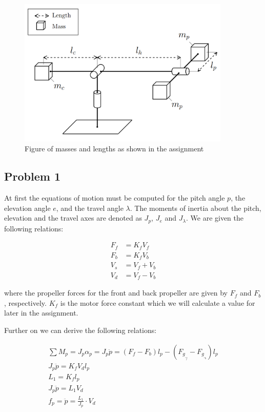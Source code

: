 \begin{figure}[H]
	\centering
	\includegraphics[width=0.9\textwidth]{figures/modelofmassesandlength}
	\caption{Figure of masses and lengths as shown in the assignment }
\label{fig:heli2}
\end{figure}


\subsection{Problem 1}
At first the equations of motion must be computed for the pitch angle $p$, the elevation angle $e$, and the travel angle $\lambda$. The moments of inertia about the pitch, elevation and the travel axes are denoted as $J_p$, $J_e$ and $J_{\lambda}$.
We are given the following relations:

\begin{equations}
    \begin{align}
        F_f &= K_f V_f \\ 
        F_b &= K_f V_b \\
        V_s &= V_f+V_b \\
        V_d &= V_f-V_b
    \end{align}
\end{equations}
\newline
where the propeller forces for the front and back propeller are given by $F_f$ and $F_b$, respectively. $K_f$ is the motor force constant which we will calculate a value for later in the assignment. 

Further on we can derive the following relations:

\begin{equations}
    \begin{gather}
        \sum M_p=J_p\alpha_p=J_p\ddot{p}=(F_f-F_b)l_p-(F_g_,_f-F_g_,_b)l_p \nonumber \\
        J_p\ddot{p}=K_fV_dl_p \nonumber \\
        L_1=K_fl_p \nonumber \\
        J_p\ddot{p}=L_1V_d \label{eq: 1}  \\
        f_p = \ddot{p} = \frac{L_1}{J_p} \cdot V_d \label{eq: fp}
    \end{gather}
\end{equations}


